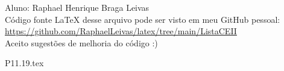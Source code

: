 \documentclass[12pt]{scrartcl}
\begin{document}
Aluno: Raphael Henrique Braga Leivas \\[20pt]
Código fonte LaTeX desse arquivo pode ser visto em meu GitHub pessoal: \\[10pt]
\href{https://github.com/RaphaelLeivas/latex/tree/main/ListaCEII}{https://github.com/RaphaelLeivas/latex/tree/main/ListaCEII} \\[20pt]
Aceito sugestões de melhoria do código :) 



{P11.19.tex}
\end{document}
